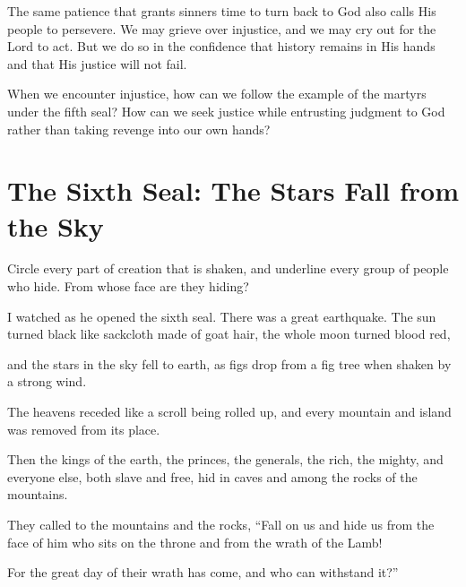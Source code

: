 The same patience that grants sinners time to turn back to God also calls His people to persevere. We may grieve over injustice, and we may cry out for the Lord to act. But we do so in the confidence that history remains in His hands and that His justice will not fail.

\begin{ReaderQuestion}
When we encounter injustice, how can we follow the example of the martyrs under the fifth seal? How can we seek justice while entrusting judgment to God rather than taking revenge into our own hands?
\end{ReaderQuestion}

\section{The Sixth Seal: The Stars Fall from the Sky}

\begin{ScriptureBox2}{Circle every part of creation that is shaken, and underline every group of people who hide. From whose face are they hiding?}

\item[6:12] I watched as he opened the sixth seal. There was a great earthquake. The sun turned black like sackcloth made of goat hair, the whole moon turned blood red,

\item[6:13] and the stars in the sky fell to earth, as figs drop from a fig tree when shaken by a strong wind.

\item[6:14] The heavens receded like a scroll being rolled up, and every mountain and island was removed from its place.

\item[6:15] Then the kings of the earth, the princes, the generals, the rich, the mighty, and everyone else, both slave and free, hid in caves and among the rocks of the mountains.

\item[6:16] They called to the mountains and the rocks, ``Fall on us and hide us from the face of him who sits on the throne and from the wrath of the Lamb!

\item[6:17] For the great day of their wrath has come, and who can withstand it?''
\end{ScriptureBox2}

